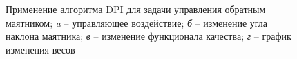 \begin{figure}[ht!]
\begin{minipage}[h]{0.49\linewidth}
	\end{minipage}
	\hfill
	\begin{minipage}[h]{0.49\linewidth}
	\end{minipage}
	\hfill
	\begin{minipage}[h]{0.49\linewidth}
	\end{minipage}
	\caption{Применение алгоритма DPI для задачи управления обратным маятником; \textit{a} -- управляющее воздействие; \textit{б} -- изменение угла наклона маятника; \textit{в} -- изменение функционала качества; \textit{г} -- график изменения весов}
	\label{fig:pend-ch3}
\end{figure}

